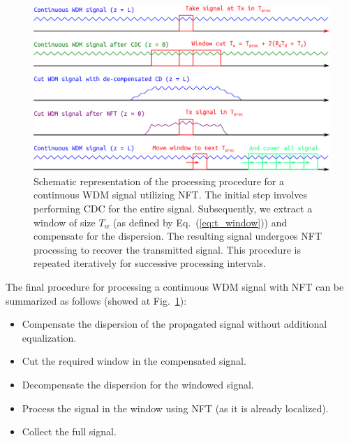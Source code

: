 \begin{figure}[!hbt]
    \centering
    \includegraphics[width=1\linewidth]{images/window/scheme.pdf}
    \caption{Schematic representation of the processing procedure for a continuous WDM signal utilizing NFT. The initial step involves performing CDC for the entire signal. Subsequently, we extract a window of size $T_w$ (as defined by Eq.~(\ref{eq:t_window})) and compensate for the dispersion. The resulting signal undergoes NFT processing to recover the transmitted signal. This procedure is repeated iteratively for successive processing intervals.}
    \label{fig:process_scheme_window}
\end{figure}

The final procedure for processing a continuous WDM signal with NFT can be summarized as follows (showed at Fig.~\ref{fig:process_scheme_window}):
\begin{itemize}
\item Compensate the dispersion of the propagated signal without additional equalization.
\item Cut the required window in the compensated signal.
\item Decompensate the dispersion for the windowed signal.
\item Process the signal in the window using NFT (as it is already localized).
\item Collect the full signal.
\end{itemize}
